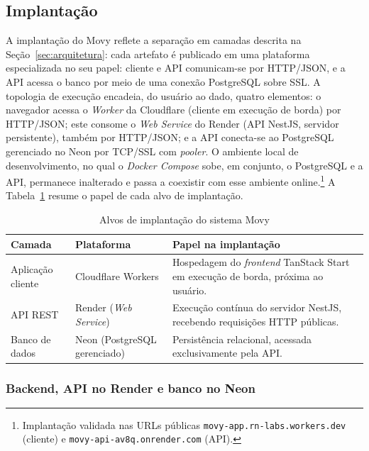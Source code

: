 \subsection{Implantação}
\label{subsec:implantacao}

A implantação do Movy reflete a separação em camadas descrita na Seção~\ref{sec:arquitetura}: cada artefato é publicado em uma plataforma especializada no seu papel: cliente e API comunicam-se por HTTP/JSON, e a API acessa o banco por meio de uma conexão PostgreSQL sobre SSL. A topologia de execução encadeia, do usuário ao dado, quatro elementos: o navegador acessa o \textit{Worker} da Cloudflare (cliente em execução de borda) por HTTP/JSON; este consome o \textit{Web Service} do Render (API NestJS, servidor persistente), também por HTTP/JSON; e a API conecta-se ao PostgreSQL gerenciado no Neon por TCP/SSL com \textit{pooler}. O ambiente local de desenvolvimento, no qual o \textit{Docker Compose} sobe, em conjunto, o PostgreSQL e a API, permanece inalterado e passa a coexistir com esse ambiente online.\footnote{Implantação validada nas URLs públicas \texttt{movy-app.rn-labs.workers.dev} (cliente) e \texttt{movy-api-av8q.onrender.com} (API).} A Tabela~\ref{tab:implantacao} resume o papel de cada alvo de implantação.

\begin{table}[H]
\centering
\caption{Alvos de implantação do sistema Movy}
\label{tab:implantacao}
\begin{tabularx}{\textwidth}{l l X}
\toprule
\textbf{Camada} & \textbf{Plataforma} & \textbf{Papel na implantação} \\
\midrule
Aplicação cliente & Cloudflare Workers & Hospedagem do \textit{frontend} TanStack Start em execução de borda, próxima ao usuário. \\
API REST & Render (\textit{Web Service}) & Execução contínua do servidor NestJS, recebendo requisições HTTP públicas. \\
Banco de dados & Neon (PostgreSQL gerenciado) & Persistência relacional, acessada exclusivamente pela API. \\
\bottomrule
\end{tabularx}
\end{table}

\subsubsection{Backend, API no Render e banco no Neon}

